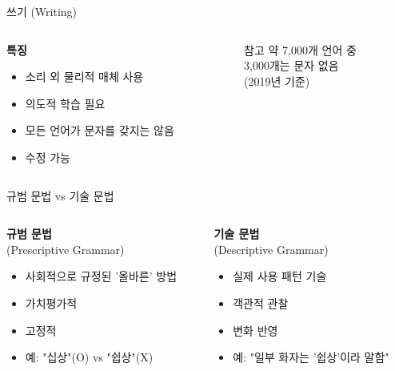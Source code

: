 \documentclass[aspectratio=169]{beamer}
\begin{document}
\begin{frame}{쓰기 (Writing)}
\begin{columns}
\begin{column}{0.6\textwidth}
\textbf{특징}
\begin{itemize}
\item 소리 외 물리적 매체 사용
\item 의도적 학습 필요
\item 모든 언어가 문자를 갖지는 않음
\item 수정 가능
\end{itemize}
\end{column}
\begin{column}{0.4\textwidth}
\begin{alertblock}{참고}
약 7,000개 언어 중\\
3,000개는 문자 없음\\
(2019년 기준)
\end{alertblock}
\end{column}
\end{columns}
\end{frame}

\begin{frame}{규범 문법 vs 기술 문법}
\begin{columns}
\begin{column}{0.5\textwidth}
\textbf{규범 문법}\\
(Prescriptive Grammar)
\begin{itemize}
\item 사회적으로 규정된 '올바른' 방법
\item 가치평가적
\item 고정적
\item 예: "십상"(O) vs "쉽상"(X)
\end{itemize}
\end{column}
\begin{column}{0.5\textwidth}
\textbf{기술 문법}\\
(Descriptive Grammar)
\begin{itemize}
\item 실제 사용 패턴 기술
\item 객관적 관찰
\item 변화 반영
\item 예: "일부 화자는 '쉽상'이라 말함"
\end{itemize}
\end{column}
\end{columns}
\end{frame}
\end{document}
